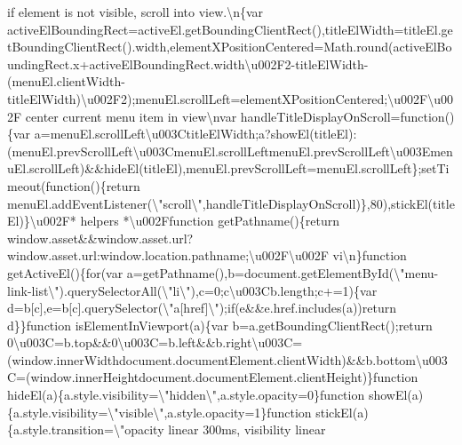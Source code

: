 if element is not visible, scroll into view.\textbackslash{}n\{var
activeElBoundingRect=activeEl.getBoundingClientRect(),titleElWidth=titleEl.getBoundingClientRect().width,elementXPositionCentered=Math.round(activeElBoundingRect.x+activeElBoundingRect.width\textbackslash{}u002F2-titleElWidth-(menuEl.clientWidth-titleElWidth)\textbackslash{}u002F2);menuEl.scrollLeft=elementXPositionCentered;\textbackslash{}u002F\textbackslash{}u002F
center current menu item in view\textbackslash{}nvar
handleTitleDisplayOnScroll=function()\{var
a=menuEl.scrollLeft\textbackslash{}u003CtitleElWidth;a?showEl(titleEl):(menuEl.prevScrollLeft\textbackslash{}u003CmenuEl.scrollLeft\textbar{}\textbar{}menuEl.prevScrollLeft\textbackslash{}u003EmenuEl.scrollLeft)\&\&hideEl(titleEl),menuEl.prevScrollLeft=menuEl.scrollLeft\};setTimeout(function()\{return
menuEl.addEventListener(\textbackslash{}"scroll\textbackslash{}",handleTitleDisplayOnScroll)\},80),stickEl(titleEl)\}\textbackslash{}u002F*
helpers *\textbackslash{}u002Ffunction getPathname()\{return
window.asset\&\&window.asset.url?window.asset.url:window.location.pathname;\textbackslash{}u002F\textbackslash{}u002F
vi\textbackslash{}n\}function getActiveEl()\{for(var
a=getPathname(),b=document.getElementById(\textbackslash{}"menu-link-list\textbackslash{}").querySelectorAll(\textbackslash{}"li\textbackslash{}"),c=0;c\textbackslash{}u003Cb.length;c+=1)\{var
d=b{[}c{]},e=b{[}c{]}.querySelector(\textbackslash{}"a{[}href{]}\textbackslash{}");if(e\&\&e.href.includes(a))return
d\}\}function isElementInViewport(a)\{var
b=a.getBoundingClientRect();return
0\textbackslash{}u003C=b.top\&\&0\textbackslash{}u003C=b.left\&\&b.right\textbackslash{}u003C=(window.innerWidth\textbar{}\textbar{}document.documentElement.clientWidth)\&\&b.bottom\textbackslash{}u003C=(window.innerHeight\textbar{}\textbar{}document.documentElement.clientHeight)\}function
hideEl(a)\{a.style.visibility=\textbackslash{}"hidden\textbackslash{}",a.style.opacity=0\}function
showEl(a)\{a.style.visibility=\textbackslash{}"visible\textbackslash{}",a.style.opacity=1\}function
stickEl(a)\{a.style.transition=\textbackslash{}"opacity linear 300ms,
visibility linear
